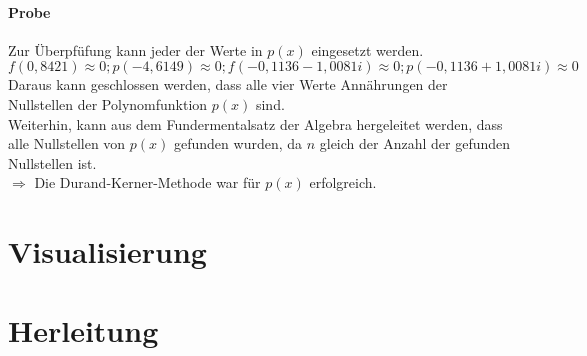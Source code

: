 \documentclass[12pt]{article}
\begin{document}
\paragraph{Probe}
Zur Überpfüfung kann jeder der Werte in $p(x)$ eingesetzt werden.
\begin{displaymath}
    f(0,8421) \approx 0; p(-4,6149) \approx 0; f(-0,1136 - 1,0081i) \approx 0; p(-0,1136 + 1,0081i) \approx 0
\end{displaymath}
Daraus kann geschlossen werden, dass alle vier Werte Annährungen der Nullstellen der Polynomfunktion $p(x)$ sind. \\
Weiterhin, kann aus dem Fundermentalsatz der Algebra hergeleitet werden, dass alle Nullstellen von $p(x)$ gefunden wurden, da $n$ gleich der Anzahl der gefunden Nullstellen ist. \\
$\Rightarrow$ Die Durand-Kerner-Methode war für $p(x)$ erfolgreich.

\section{Visualisierung}

\section{Herleitung}
\end{document}
